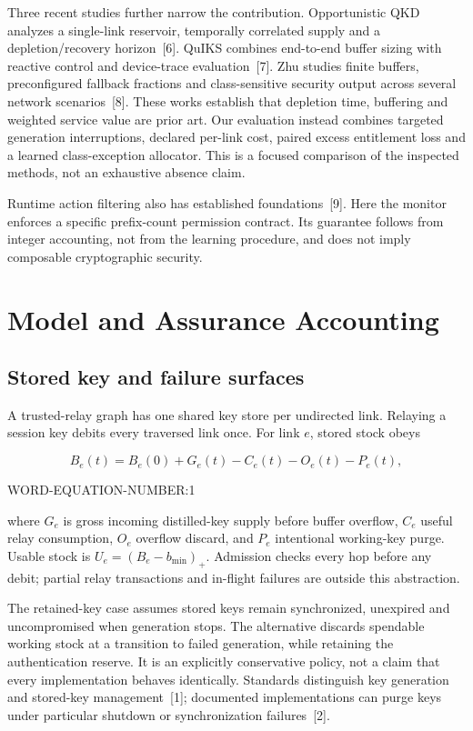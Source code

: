 \documentclass[conference,a4paper]{IEEEtran}
\begin{document}
Three recent studies further narrow the contribution. Opportunistic QKD analyzes a single-link reservoir, temporally correlated supply and a depletion/recovery horizon~[6]. QuIKS combines end-to-end buffer sizing with reactive control and device-trace evaluation~[7]. Zhu studies finite buffers, preconfigured fallback fractions and class-sensitive security output across several network scenarios~[8]. These works establish that depletion time, buffering and weighted service value are prior art. Our evaluation instead combines targeted generation interruptions, declared per-link cost, paired excess entitlement loss and a learned class-exception allocator. This is a focused comparison of the inspected methods, not an exhaustive absence claim.

Runtime action filtering also has established foundations~[9]. Here the monitor enforces a specific prefix-count permission contract. Its guarantee follows from integer accounting, not from the learning procedure, and does not imply composable cryptographic security.

\section{Model and Assurance Accounting}\label{sec:model}
\subsection{Stored key and failure surfaces}
A trusted-relay graph has one shared key store per undirected link. Relaying a session key debits every traversed link once. For link $e$, stored stock obeys


\[
B_e(t)=B_e(0)+G_e(t)-C_e(t)-O_e(t)-P_e(t),
\]

WORD-EQUATION-NUMBER:1


where $G_e$ is gross incoming distilled-key supply before buffer overflow, $C_e$ useful relay consumption, $O_e$ overflow discard, and $P_e$ intentional working-key purge. Usable stock is $U_e=(B_e-b_{\min})_+$. Admission checks every hop before any debit; partial relay transactions and in-flight failures are outside this abstraction.

The retained-key case assumes stored keys remain synchronized, unexpired and uncompromised when generation stops. The alternative discards spendable working stock at a transition to failed generation, while retaining the authentication reserve. It is an explicitly conservative policy, not a claim that every implementation behaves identically. Standards distinguish key generation and stored-key management~[1]; documented implementations can purge keys under particular shutdown or synchronization failures~[2].
\end{document}
